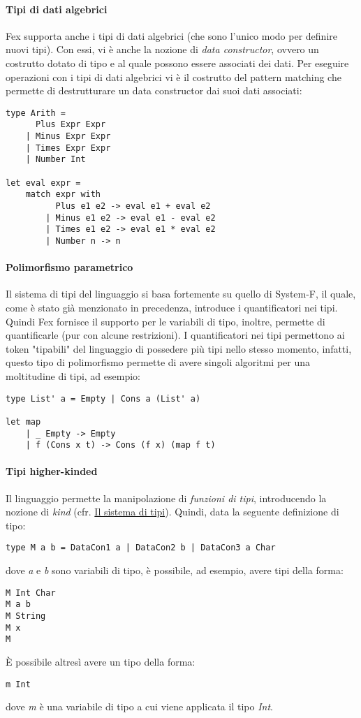 \documentclass[10pt,a4paper]{article}
\begin{document}
\paragraph{Tipi di dati algebrici}
Fex supporta anche i tipi di dati algebrici (che sono l'unico modo per definire nuovi
tipi). Con essi, vi è anche la nozione di \textit{data constructor}, ovvero un costrutto dotato di tipo e al quale
possono essere associati dei dati. Per eseguire operazioni con i tipi di dati algebrici vi è il costrutto del pattern
matching che permette di destrutturare un data constructor dai suoi dati associati:
\begin{lstlisting}
type Arith =
      Plus Expr Expr
    | Minus Expr Expr
    | Times Expr Expr
    | Number Int

let eval expr =
    match expr with
          Plus e1 e2 -> eval e1 + eval e2
        | Minus e1 e2 -> eval e1 - eval e2
        | Times e1 e2 -> eval e1 * eval e2
        | Number n -> n
\end{lstlisting}

\paragraph{Polimorfismo parametrico}
Il sistema di tipi del linguaggio si basa fortemente su quello di System-F, il quale, come
è stato già menzionato in precedenza, introduce i quantificatori nei tipi. Quindi Fex fornisce il supporto per le variabili
di tipo, inoltre, permette di quantificarle (pur con alcune restrizioni). I quantificatori nei tipi permettono ai token
"tipabili" del linguaggio di possedere più tipi nello stesso momento, infatti, questo tipo di polimorfismo permette di avere
singoli algoritmi per una moltitudine di tipi, ad esempio:
\begin{lstlisting}
type List' a = Empty | Cons a (List' a)

let map
    | _ Empty -> Empty
    | f (Cons x t) -> Cons (f x) (map f t)
\end{lstlisting}

\paragraph{Tipi higher-kinded}
Il linguaggio permette la manipolazione di \textit{funzioni di tipi}, introducendo la nozione di
\textit{kind} (cfr. \hyperlink{Il sistema di tipi}{Il sistema di tipi}). Quindi, data la seguente definizione di tipo:
\begin{lstlisting}
type M a b = DataCon1 a | DataCon2 b | DataCon3 a Char
\end{lstlisting}
dove \textit{a} e \textit{b} sono variabili di tipo, è possibile, ad esempio, avere tipi della forma:
\begin{lstlisting}
M Int Char
M a b
M String
M x
M
\end{lstlisting}
\`E possibile altresì avere un tipo della forma:
\begin{lstlisting}
m Int
\end{lstlisting}
dove \textit{m} è una variabile di tipo a cui viene applicata il tipo \textit{Int}.
\end{document}
